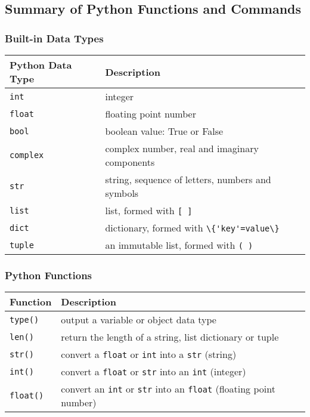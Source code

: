 \documentclass{book}
\newcommand{\passthrough}[1]{#1}
\begin{document}
    
        \hypertarget{summary-of-python-functions-and-commands}{%
\subsection{Summary of Python Functions and
Commands}\label{summary-of-python-functions-and-commands}}
    




    
        \hypertarget{built-in-data-types}{%
\subsubsection{Built-in Data Types}\label{built-in-data-types}}

\begin{longtable}[]{@{}ll@{}}
\toprule
Python Data Type & Description\tabularnewline
\midrule
\endhead
\passthrough{\lstinline!int!} & integer\tabularnewline
\passthrough{\lstinline!float!} & floating point number\tabularnewline
\passthrough{\lstinline!bool!} & boolean value: True or
False\tabularnewline
\passthrough{\lstinline!complex!} & complex number, real and imaginary
components\tabularnewline
\passthrough{\lstinline!str!} & string, sequence of letters, numbers and
symbols\tabularnewline
\passthrough{\lstinline!list!} & list, formed with
\passthrough{\lstinline![ ]!}\tabularnewline
\passthrough{\lstinline!dict!} & dictionary, formed with
\passthrough{\lstinline!\{'key'=value\}!}\tabularnewline
\passthrough{\lstinline!tuple!} & an immutable list, formed with
\passthrough{\lstinline!( )!}\tabularnewline
\bottomrule
\end{longtable}

\hypertarget{python-functions}{%
\subsubsection{Python Functions}\label{python-functions}}

\begin{longtable}[]{@{}ll@{}}
\toprule
Function & Description\tabularnewline
\midrule
\endhead
\passthrough{\lstinline!type()!} & output a variable or object data
type\tabularnewline
\passthrough{\lstinline!len()!} & return the length of a string, list
dictionary or tuple\tabularnewline
\passthrough{\lstinline!str()!} & convert a
\passthrough{\lstinline!float!} or \passthrough{\lstinline!int!} into a
\passthrough{\lstinline!str!} (string)\tabularnewline
\passthrough{\lstinline!int()!} & convert a
\passthrough{\lstinline!float!} or \passthrough{\lstinline!str!} into an
\passthrough{\lstinline!int!} (integer)\tabularnewline
\passthrough{\lstinline!float()!} & convert an
\passthrough{\lstinline!int!} or \passthrough{\lstinline!str!} into an
\passthrough{\lstinline!float!} (floating point number)\tabularnewline
\bottomrule
\end{longtable}
\end{document}

